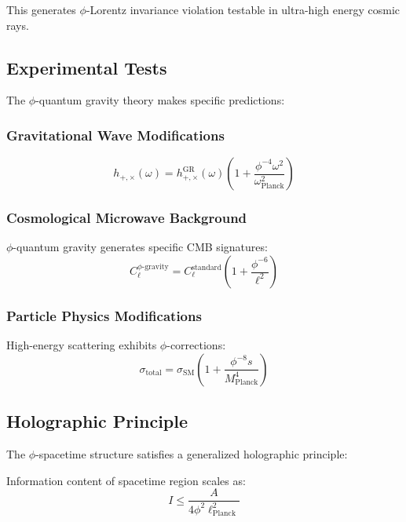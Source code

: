 This generates $\phi$-Lorentz invariance violation testable in ultra-high energy cosmic rays.

\subsection{Experimental Tests}

The $\phi$-quantum gravity theory makes specific predictions:

\subsubsection{Gravitational Wave Modifications}

\begin{equation}
h_{+,\times}(\omega) = h_{+,\times}^{\text{GR}}(\omega) \left(1 + \frac{\phi^{-4} \omega^2}{\omega_{\text{Planck}}^2}\right)
\end{equation}

\subsubsection{Cosmological Microwave Background}

$\phi$-quantum gravity generates specific CMB signatures:
\begin{equation}
C_\ell^{\text{$\phi$-gravity}} = C_\ell^{\text{standard}} \left(1 + \frac{\phi^{-6}}{\ell^2}\right)
\end{equation}

\subsubsection{Particle Physics Modifications}

High-energy scattering exhibits $\phi$-corrections:
\begin{equation}
\sigma_{\text{total}} = \sigma_{\text{SM}} \left(1 + \frac{\phi^{-8} s}{M_{\text{Planck}}^4}\right)
\end{equation}

\subsection{Holographic Principle}

The $\phi$-spacetime structure satisfies a generalized holographic principle:

\begin{theorem}
Information content of spacetime region scales as:
\begin{equation}
I \leq \frac{A}{4\phi^2 \ell_{\text{Planck}}^2}
\label{eq:phi_holographic_bound}
\end{equation}
\end{theorem}

